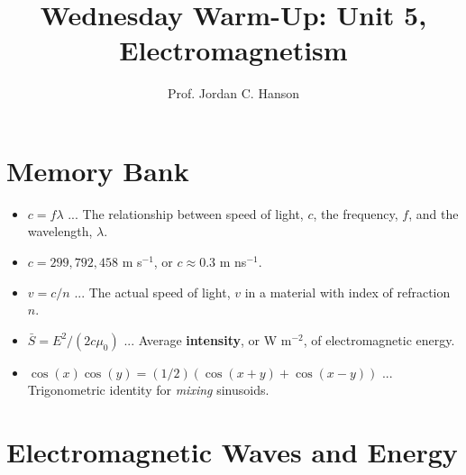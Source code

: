 \documentclass{article}
\begin{document}
\twocolumn

\title{Wednesday Warm-Up: Unit 5, Electromagnetism}
\author{Prof. Jordan C. Hanson}

\maketitle

\section{Memory Bank}

\begin{itemize}
\item $c = f\lambda$ ... The relationship between speed of light, $c$, the frequency, $f$, and the wavelength, $\lambda$.
\item $c = 299,792,458$ m s$^{-1}$, or $c \approx 0.3$ m ns$^{-1}$.
\item $v = c/n$ ... The actual speed of light, $v$ in a material with index of refraction $n$.
\item $\bar{S} = E^2/(2c\mu_0)$ ... Average \textbf{intensity}, or W m$^{-2}$, of electromagnetic energy.
\item $\cos(x)\cos(y) = (1/2)(\cos(x+y) + \cos(x-y))$ ... Trigonometric identity for \textit{mixing} sinusoids.
\end{itemize}

\section{Electromagnetic Waves and Energy}
\end{document}

